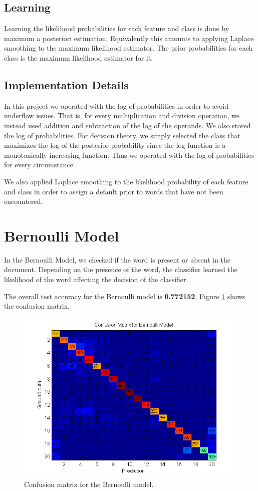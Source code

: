 \documentclass[12pt]{article}
\begin{document}
\subsection{Learning}
Learning the likelihood probabilities for each feature and class is done by maximum a posteriori estimation. Equivalently this amounts to applying Laplace smoothing to the maximum likelihood estimator. The prior probabilities for each class is the maximum likelihood estimator for it.

\subsection{Implementation Details}
In this project we operated with the log of probabilities in order to avoid underflow issues. That is, for every multiplication and division operation, we instead used addition and subtraction of the log of the operands. We also stored the log of probabilities. For decision theory, we simply selected the class that maximizes the log of the posterior probability since the log function is a monotonically increasing function. Thus we operated with the log of probabilities for every circumstance.

We also applied Laplace smoothing to the likelihood probability of each feature and class in order to assign a default prior to words that have not been encountered.

\section{Bernoulli Model}

In the Bernoulli Model, we checked if the word is present or absent in the document. Depending on the presence of the word, the classifier learned the likelihood of the word affecting the decision of the classifier.

The overall test accuracy for the Bernoulli model is \textbf{0.772152}. Figure \ref{fig:confusionmat_bern} shows the confusion matrix.

\begin{figure}[!t]
  \centering
  \includegraphics[scale=1]{img/confusionmat_bern.png}
  \caption{Confusion matrix for the Bernoulli model.}
  \label{fig:confusionmat_bern}
\end{figure}
\end{document}
